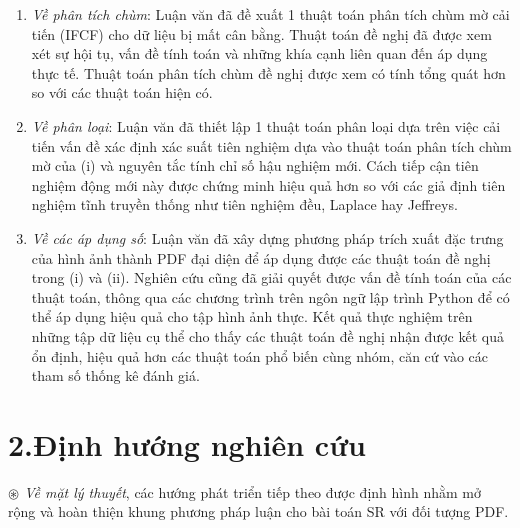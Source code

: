 \documentclass[a4paper,oneside]{book} %
\theoremstyle{plain}
\theoremstyle{plain}
\theoremstyle{nonumberplain}
\begin{document}
\begin{enumerate}[label=(\roman*), leftmargin=2em, itemsep=1ex]
	\item \textit{Về phân tích chùm}: Luận văn đã đề xuất 1 thuật toán phân tích chùm mờ cải tiến (IFCF) cho dữ liệu bị mất cân bằng. Thuật toán đề nghị đã được xem xét sự hội tụ, vấn đề tính toán và những khía cạnh liên quan đến áp dụng thực tế. Thuật toán phân tích chùm đề nghị được xem có tính tổng quát hơn so với các thuật toán hiện có.
	\item \textit{Về phân loại}: Luận văn đã thiết lập 1 thuật toán phân loại dựa trên việc cải tiến vấn đề xác định xác suất tiên nghiệm dựa vào thuật toán phân tích chùm mờ của (i) và nguyên tắc tính chỉ số hậu nghiệm mới. Cách tiếp cận tiên nghiệm động mới này được chứng minh hiệu quả hơn so với các giả định tiên nghiệm tĩnh truyền thống như tiên nghiệm đều, Laplace hay Jeffreys.
	\item \textit{Về các áp dụng số}: Luận văn đã xây dựng phương pháp trích xuất đặc trưng của hình ảnh thành PDF đại diện để áp dụng được các thuật toán đề nghị trong (i) và (ii). Nghiên cứu cũng đã giải quyết được vấn đề tính toán của các thuật toán, thông qua các chương trình trên ngôn ngữ lập trình Python để có thể áp dụng hiệu quả cho tập hình ảnh thực. Kết quả thực nghiệm trên những tập dữ liệu cụ thể cho thấy các thuật toán đề nghị nhận được kết quả ổn định, hiệu quả hơn các thuật toán phổ biến cùng nhóm, căn cứ vào các tham số thống kê đánh giá.
\end{enumerate}



\section*{2.\quad Định hướng nghiên cứu}

\textit{$\circledast$ Về mặt lý thuyết}, các hướng phát triển tiếp theo được định hình nhằm mở rộng và hoàn thiện khung phương pháp luận cho bài toán SR với đối tượng PDF.
\end{document}
